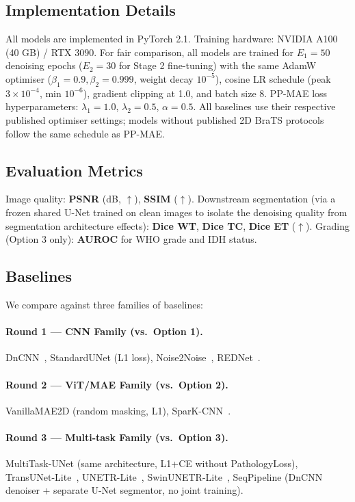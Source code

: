 \documentclass[runningheads]{llncs}
\begin{document}
\subsection{Implementation Details}

All models are implemented in PyTorch 2.1.
Training hardware: NVIDIA A100 (40 GB) / RTX 3090.
For fair comparison, all models are trained for $E_1 = 50$ denoising
epochs ($E_2 = 30$ for Stage 2 fine-tuning) with the same
AdamW optimiser ($\beta_1=0.9, \beta_2=0.999$, weight decay $10^{-5}$),
cosine LR schedule (peak $3 \times 10^{-4}$, min $10^{-6}$),
gradient clipping at 1.0, and batch size 8.
PP-MAE loss hyperparameters: $\lambda_1=1.0$, $\lambda_2=0.5$, $\alpha=0.5$.
All baselines use their respective published optimiser settings;
models without published 2D BraTS protocols follow the same schedule as PP-MAE.

\subsection{Evaluation Metrics}

Image quality: \textbf{PSNR} (dB, $\uparrow$), \textbf{SSIM} ($\uparrow$).
Downstream segmentation (via a frozen shared U-Net trained on clean images
to isolate the denoising quality from segmentation architecture effects):
\textbf{Dice WT}, \textbf{Dice TC}, \textbf{Dice ET} ($\uparrow$).
Grading (Option 3 only): \textbf{AUROC} for WHO grade and IDH status.

\subsection{Baselines}

We compare against three families of baselines:

\paragraph{Round 1 — CNN Family (vs.\ Option 1).}
DnCNN~\cite{dncnn}, StandardUNet (L1 loss), Noise2Noise~\cite{n2n},
REDNet~\cite{rednet}.

\paragraph{Round 2 — ViT/MAE Family (vs.\ Option 2).}
VanillaMAE2D (random masking, L1), SparK-CNN~\cite{spark}.

\paragraph{Round 3 — Multi-task Family (vs.\ Option 3).}
MultiTask-UNet (same architecture, L1+CE without PathologyLoss),
TransUNet-Lite~\cite{transunet},
UNETR-Lite~\cite{unetr}, SwinUNETR-Lite~\cite{swinunetr},
SeqPipeline (DnCNN denoiser + separate U-Net segmentor, no joint training).
\end{document}
